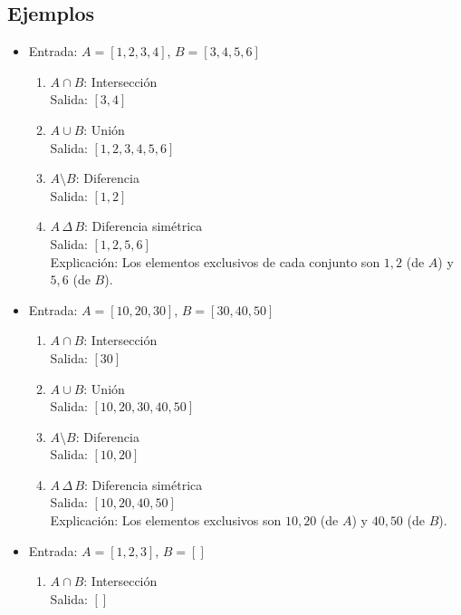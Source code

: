 \subsection*{Ejemplos}
\begin{itemize}
    \item Entrada: \( A = [1, 2, 3, 4] \), \( B = [3, 4, 5, 6] \)
    \begin{enumerate}
        \item \( A \cap B \): Intersección\\
        Salida: \([3, 4]\)

        \item \( A \cup B \): Unión\\
        Salida: \([1, 2, 3, 4, 5, 6]\)

        \item \( A \setminus B \): Diferencia\\
        Salida: \([1, 2]\)

        \item \( A \, \Delta \, B \): Diferencia simétrica\\
        Salida: \([1, 2, 5, 6]\)\\
        Explicación: Los elementos exclusivos de cada conjunto son \(1, 2\) (de \(A\)) y \(5, 6\) (de \(B\)).
    \end{enumerate}

    \item Entrada: \( A = [10, 20, 30] \), \( B = [30, 40, 50] \)
    \begin{enumerate}
        \item \( A \cap B \): Intersección\\
        Salida: \([30]\)

        \item \( A \cup B \): Unión\\
        Salida: \([10, 20, 30, 40, 50]\)

        \item \( A \setminus B \): Diferencia\\
        Salida: \([10, 20]\)

        \item \( A \, \Delta \, B \): Diferencia simétrica\\
        Salida: \([10, 20, 40, 50]\)\\
        Explicación: Los elementos exclusivos son \(10, 20\) (de \(A\)) y \(40, 50\) (de \(B\)).
    \end{enumerate}

    \item Entrada: \( A = [1, 2, 3] \), \( B = [] \)
    \begin{enumerate}
        \item \( A \cap B \): Intersección\\
        Salida: \([]\)


\end{enumerate}
\end{itemize}
